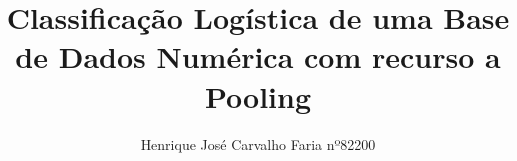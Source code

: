 %
\title{Classificação Logística de uma Base de Dados Numérica com recurso a Pooling}
%
%
\author{ Henrique José Carvalho Faria nº82200}
%
%
%
\maketitle              %
%





%
%
